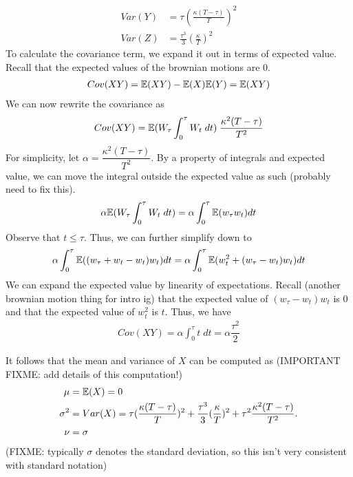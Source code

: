 \documentclass[reqno]{amsart}
\begin{document}
\begin{align}
     Var(Y) &= \tau(\frac{\kappa(T-\tau)}{T})^2\\
     Var(Z) &= \frac{\tau^3}{3}(\frac{\kappa}{T})^2
\end{align}
To calculate the covariance term, we expand it out in terms of expected value. Recall that the expected values of the brownian motions are 0.
\begin{align}
     Cov(XY) = \mathbb{E}(XY) - \mathbb{E}(X)\mathbb{E}(Y) = \mathbb{E}(XY)
\end{align}
We can now rewrite the covariance as
\begin{align}
     Cov(XY) = \mathbb{E}(W_\tau \int_0^\tau W_t \; dt) \;\dfrac{\kappa^2 (T - \tau)}{T^2}
\end{align}
For simplicity, let $\alpha = \dfrac{\kappa^2 (T - \tau)}{T^2}$. By a property of integrals and expected value, we can move the integral outside the expected value as such (probably need to fix this).
\begin{align}
     \alpha \mathbb{E}(W_\tau \int_0^\tau W_t \; dt) = \alpha \int_0^\tau \mathbb{E}(w_\tau w_t) dt
\end{align}
Observe that $t \leq \tau$. Thus, we can further simplify down to
\begin{align}
     \alpha \int_0^\tau \mathbb{E}((w_\tau + w_t - w_t) w_t) dt = \alpha \int_0^\tau \mathbb{E}(w_t^2 + (w_\tau - w_t) w_t) dt
\end{align}
We can expand the expected value by linearity of expectations. Recall (another brownian motion thing for intro ig) that the expected value of $(w_\tau - w_t) w_t$ is 0 and that the expected value of $w_t^2$ is $t$. Thus, we have
\begin{align}
     Cov(XY) = \alpha \int_0^\tau t \; dt = \alpha \dfrac{\tau^2}{2}
\end{align}

It follows that the mean and variance of $X$ can be computed as (IMPORTANT FIXME: add details of this computation!)
\begin{align}
     \mu &= \mathbb{E}(X) = 0\\
     \sigma^2 &= Var(X) = \tau(\frac{\kappa(T-\tau)}{T})^2 + \frac{\tau^3}{3}(\frac{\kappa}{T})^2 + \tau^2\frac{\kappa^2(T-\tau)}{T^2}.\\
     \nu &= \sigma
\end{align}
(FIXME: typically $\sigma$ denotes the standard deviation, so this isn't very consistent with standard notation)
\end{document}
